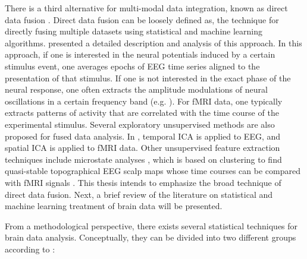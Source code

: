 There is a third alternative for multi-modal data integration, known as direct data fusion \citep{george1995mapping}. Direct data fusion can be loosely defined as, the technique for directly fusing multiple datasets using statistical and machine learning algorithms. \citet{biessmann2011analysis} presented a detailed description and analysis of this approach. In this approach, if one is interested in the neural potentials induced by a certain stimulus event, one averages epochs of EEG time series aligned to the presentation of that stimulus. If one is not interested in the exact phase of the neural response, one often extracts the amplitude modulations of neural oscillations in a certain frequency band (e.g. \citep{laufs2006bold}). For fMRI data, one typically extracts patterns of activity that are correlated with the time course of the experimental stimulus. Several exploratory unsupervised methods are also proposed for fused data analysis. In \citep{eichele2008unmixing}, temporal ICA is applied to EEG, and spatial ICA is applied to fMRI data. Other unsupervised feature extraction techniques include microstate analyses \citep{brandeis1989segments, patil2004ensemble}, which is based on clustering to find quasi-stable topographical EEG scalp maps whose time courses can be compared with fMRI signals \citep{muthukumaraswamy2008spatiotemporal}. This thesis intends to emphasize the broad technique of direct data fusion. Next, a brief review of the literature on statistical and machine learning treatment of brain data will be presented.

From a methodological perspective, there exists several statistical techniques for brain data analysis. Conceptually, they can be divided into two different groups according to \citet{horwitz1999neural}:

